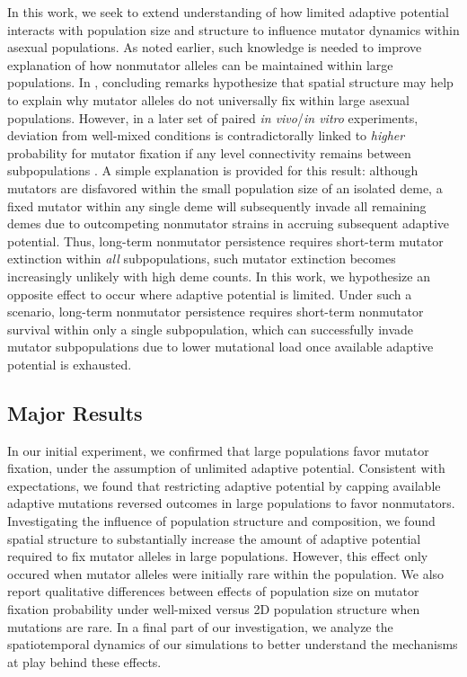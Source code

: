 In this work, we seek to extend understanding of how limited adaptive potential interacts with population size and structure to influence mutator dynamics within asexual populations.
As noted earlier, such knowledge is needed to improve explanation of how nonmutator alleles can be maintained within large populations.
In \citep{raynes2018sign}, concluding remarks hypothesize that spatial structure may help to explain why mutator alleles do not universally fix within large asexual populations.
However, in a later set of paired \textit{in vivo}/\textit{in vitro} experiments, deviation from well-mixed conditions is contradictorally linked to \textit{higher} probability for mutator fixation if any level connectivity remains between subpopulations \citep{raynes2019migration}.
A simple explanation is provided for this result: although mutators are disfavored within the small population size of an isolated deme, a fixed mutator within any single deme will subsequently invade all remaining demes due to outcompeting nonmutator strains in accruing subsequent adaptive potential.
Thus, long-term nonmutator persistence requires short-term mutator extinction within \textit{all} subpopulations, such mutator extinction becomes increasingly unlikely with high deme counts.
In this work, we hypothesize an opposite effect to occur where adaptive potential is limited.
Under such a scenario, long-term nonmutator persistence requires short-term nonmutator survival within only a single subpopulation, which can successfully invade mutator subpopulations due to lower mutational load once available adaptive potential is exhausted.

\subsection{Major Results}

In our initial experiment, we confirmed that large populations favor mutator fixation, under the assumption of unlimited adaptive potential.
Consistent with expectations, we found that restricting adaptive potential by capping available adaptive mutations reversed outcomes in large populations to favor nonmutators.
Investigating the influence of population structure and composition, we found spatial structure to substantially increase the amount of adaptive potential required to fix mutator alleles in large populations.
However, this effect only occured when mutator alleles were initially rare within the population.
We also report qualitative differences between effects of population size on mutator fixation probability under well-mixed versus 2D population structure when mutations are rare.
In a final part of our investigation, we analyze the spatiotemporal dynamics of our simulations to better understand the mechanisms at play behind these effects.


